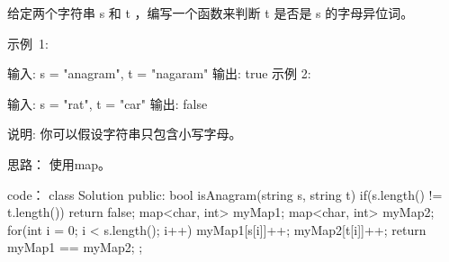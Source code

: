 给定两个字符串 s 和 t ，编写一个函数来判断 t 是否是 s 的字母异位词。

示例 1:

输入: s = "anagram", t = "nagaram"
输出: true
示例 2:

输入: s = "rat", t = "car"
输出: false

说明:
你可以假设字符串只包含小写字母。

















思路：
使用map。





















code：
class Solution {
public:
    bool isAnagram(string s, string t) {
        if(s.length() != t.length()) return false;
        map<char, int> myMap1;
        map<char, int> myMap2;
        for(int i = 0; i < s.length(); i++)
        {
            myMap1[s[i]]++;
            myMap2[t[i]]++;
        }
        return myMap1 == myMap2;
    }
};